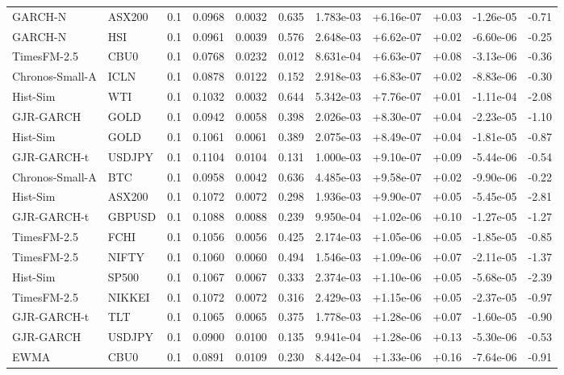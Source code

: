 \begin{tabular}{llrrrrrrrrr}
GARCH-N & ASX200 & 0.1 & 0.0968 & 0.0032 & 0.635 & 1.783e-03 & +6.16e-07 & +0.03 & -1.26e-05 & -0.71 \\
GARCH-N & HSI & 0.1 & 0.0961 & 0.0039 & 0.576 & 2.648e-03 & +6.62e-07 & +0.02 & -6.60e-06 & -0.25 \\
TimesFM-2.5 & CBU0 & 0.1 & 0.0768 & 0.0232 & 0.012 & 8.631e-04 & +6.63e-07 & +0.08 & -3.13e-06 & -0.36 \\
Chronos-Small-A & ICLN & 0.1 & 0.0878 & 0.0122 & 0.152 & 2.918e-03 & +6.83e-07 & +0.02 & -8.83e-06 & -0.30 \\
Hist-Sim & WTI & 0.1 & 0.1032 & 0.0032 & 0.644 & 5.342e-03 & +7.76e-07 & +0.01 & -1.11e-04 & -2.08 \\
GJR-GARCH & GOLD & 0.1 & 0.0942 & 0.0058 & 0.398 & 2.026e-03 & +8.30e-07 & +0.04 & -2.23e-05 & -1.10 \\
Hist-Sim & GOLD & 0.1 & 0.1061 & 0.0061 & 0.389 & 2.075e-03 & +8.49e-07 & +0.04 & -1.81e-05 & -0.87 \\
GJR-GARCH-t & USDJPY & 0.1 & 0.1104 & 0.0104 & 0.131 & 1.000e-03 & +9.10e-07 & +0.09 & -5.44e-06 & -0.54 \\
Chronos-Small-A & BTC & 0.1 & 0.0958 & 0.0042 & 0.636 & 4.485e-03 & +9.58e-07 & +0.02 & -9.90e-06 & -0.22 \\
Hist-Sim & ASX200 & 0.1 & 0.1072 & 0.0072 & 0.298 & 1.936e-03 & +9.90e-07 & +0.05 & -5.45e-05 & -2.81 \\
GJR-GARCH-t & GBPUSD & 0.1 & 0.1088 & 0.0088 & 0.239 & 9.950e-04 & +1.02e-06 & +0.10 & -1.27e-05 & -1.27 \\
TimesFM-2.5 & FCHI & 0.1 & 0.1056 & 0.0056 & 0.425 & 2.174e-03 & +1.05e-06 & +0.05 & -1.85e-05 & -0.85 \\
TimesFM-2.5 & NIFTY & 0.1 & 0.1060 & 0.0060 & 0.494 & 1.546e-03 & +1.09e-06 & +0.07 & -2.11e-05 & -1.37 \\
Hist-Sim & SP500 & 0.1 & 0.1067 & 0.0067 & 0.333 & 2.374e-03 & +1.10e-06 & +0.05 & -5.68e-05 & -2.39 \\
TimesFM-2.5 & NIKKEI & 0.1 & 0.1072 & 0.0072 & 0.316 & 2.429e-03 & +1.15e-06 & +0.05 & -2.37e-05 & -0.97 \\
GJR-GARCH-t & TLT & 0.1 & 0.1065 & 0.0065 & 0.375 & 1.778e-03 & +1.28e-06 & +0.07 & -1.60e-05 & -0.90 \\
GJR-GARCH & USDJPY & 0.1 & 0.0900 & 0.0100 & 0.135 & 9.941e-04 & +1.28e-06 & +0.13 & -5.30e-06 & -0.53 \\
EWMA & CBU0 & 0.1 & 0.0891 & 0.0109 & 0.230 & 8.442e-04 & +1.33e-06 & +0.16 & -7.64e-06 & -0.91 \\

\end{tabular}
